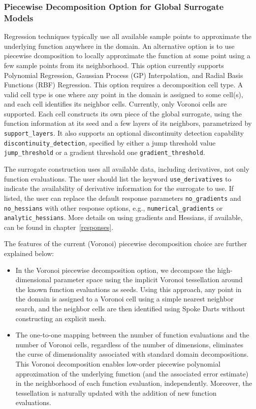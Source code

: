 \subsubsection{Piecewise Decomposition Option for Global Surrogate Models}\label{models:surf:piecewise_decomp}
Regression techniques typically use all available sample points to approximate the underlying function anywhere in the domain. An alternative option is to use piecewise dcomposition to locally approximate the function at some point using a few sample points from its neighborhood. This option currently supports Polynomial Regression, Gaussian Process (GP) Interpolation, and Radial Basis Functions (RBF) Regression. This option requires a decomposition cell type. A valid cell type is one where any point in the domain is assigned to some cell(s), and each cell identifies its neighbor cells. Currently, only Voronoi cells are supported. Each cell constructs its own piece of the global surrogate, using the function information at its seed and a few layers of its neighbors, parametrized by \texttt{support\_layers}. It also supports an optional discontinuity detection capability \texttt{discontinuity\_detection}, specified by either a jump threshold value \texttt{jump\_threshold} or a gradient threshold one \texttt{gradient\_threshold}. 

The surrogate construction uses all available data, including derivatives, not only function evaluations. The user should list the keyword \texttt{use\_derivatives} to indicate the availability of derivative information for the surrogate to use. If listed, the user can replace the default response parameters \texttt{no\_gradients} and \texttt{no\_hessians} with other response options, e.g., \texttt{numerical\_gradients} or \texttt{analytic\_hessians}. More details on using gradients and Hessians, if available, can be found in chapter~\ref{responses}. 

The features of the current (Voronoi) piecewise decomposition choice are further explained below: 

\begin{itemize}
	\item In the Voronoi piecewise decomposition option, we decompose the high-dimensional parameter space using the implicit Voronoi tessellation around the known function evaluations as seeds. Using this approach, any point in the domain is assigned to a Voronoi cell using a simple nearest neighbor search, and the neighbor cells are then identified using Spoke Darts without constructing an explicit mesh. 
	\item The one-to-one mapping between the number of function evaluations and the number of Voronoi cells, regardless of the number of dimensions, eliminates the curse of dimensionality associated with standard domain decompositions. This Voronoi decomposition enables low-order piecewise polynomial approximation of the underlying function (and the associated error estimate) in the neighborhood of each function evaluation, independently. Moreover, the tessellation is naturally updated with the addition of new function evaluations.  
\end{itemize}

